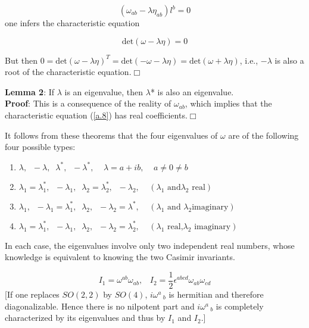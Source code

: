 \documentclass[12pt]{article}
\newcounter{c1} \newcounter{c2}
\newcommand{\bb}{\begin{equation}}
\newcommand{\ee}{\end{equation}}
\newcommand{\m}{\mbox{$\frac{1}{2}$}}
\begin{document}
\bb
(\omega_{ab} -\lambda \eta_{ab})l^{b} =0
\label{a.7}
\ee
%
one infers the characteristic equation

\bb
\mbox{det}(\omega -\lambda \eta)=0
\label{a.8}
\ee

But then $ 0=\mbox{det}(\omega-\lambda \eta)^T
=\mbox{det}(-\omega-\lambda
\eta)=\mbox{det}(\omega +\lambda \eta)$, i.e., $-\lambda$ is
also a root of the characteristic equation.$\Box$


{\bf Lemma 2}: If $\lambda$ is an eigenvalue, then $\lambda$* is also
an eigenvalue.\\

{\bf Proof}: This is a consequence of the reality of $\omega_{ab}$,
which implies that the characteristic equation (\ref{a.8}) has
real coefficients.$\Box$

\vspace{1cm}

It follows from these theorems that the four eigenvalues of
$\omega$ are of the following four possible types:

\begin{enumerate}
\item $ \lambda,\;\; -\lambda,\;\; \lambda^{*},\;\;
-\lambda^{*},\;\;\;\; \lambda=a +ib,\;\;\;\; a\neq 0
\neq b$

\item $\lambda_1 = \lambda_1^{*},\;\; -\lambda_1,\;\; \lambda_2
= \lambda_2^{*},\;\; -\lambda_2,\;\; \;\;(\mbox{$\lambda_1$  and
$\lambda_2$  real})$

\item $ \lambda_1,\;\; -\lambda_1 = \lambda_1^{*},\;\; \lambda_2,\;\;
-\lambda_2 =  \lambda^{*} ,\;\;\;\;(\mbox{$\lambda_1$ and $\lambda_2$
imaginary})$

\item $ \lambda_1 =\lambda_1^{*},\;\;  -\lambda_1,\;\; \lambda_2,\;\;
-\lambda_2 =\lambda_2^{*},\;\;\;\; (\mbox{$\lambda_1$ real,
$\lambda_2$ imaginary})$
\end{enumerate}

In each case, the eigenvalues involve only two independent real
numbers, whose knowledge is equivalent to knowing the two
Casimir invariants.

\bb
I_1 = \omega^{ab}\omega_{ab}, \;\;\; I_2 = \m \epsilon^{abcd}
\omega_{ab} \omega_{cd}
\label{a.9}
\ee
%
[If one replaces $SO(2,2)$ by $SO(4)$, $i\omega^a\,_b$ is
hermitian and therefore diagonalizable. Hence there is no
nilpotent part and $i\omega^a\,_b$ is completely
characterized by its eigenvalues and thus by $I_1$ and $I_2$.]
\end{document}
